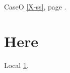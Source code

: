 \documentclass{article}
\begin{document}
CaseO \ref{X-ss}, page \pageref{X-front}.

\section{Here}\label{here}
Local \ref{here}.
\end{document}
